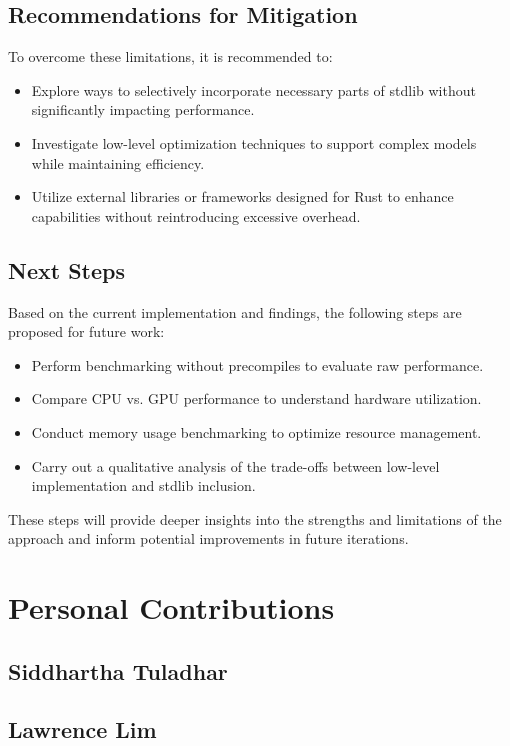 \documentclass{scrartcl}
\begin{document}
\subsection{Recommendations for Mitigation}
To overcome these limitations, it is recommended to:
\begin{itemize}
    \item Explore ways to selectively incorporate necessary parts of stdlib without significantly impacting performance.
    \item Investigate low-level optimization techniques to support complex models while maintaining efficiency.
    \item Utilize external libraries or frameworks designed for Rust to enhance capabilities without reintroducing excessive overhead.
\end{itemize}

\subsection{Next Steps}
Based on the current implementation and findings, the following steps are proposed for future work:
\begin{itemize}
    \item Perform benchmarking without precompiles to evaluate raw performance.
    \item Compare CPU vs. GPU performance to understand hardware utilization.
    \item Conduct memory usage benchmarking to optimize resource management.
    \item Carry out a qualitative analysis of the trade-offs between low-level implementation and stdlib inclusion.
\end{itemize}

These steps will provide deeper insights into the strengths and limitations of the approach and inform potential improvements in future iterations.


\section{Personal Contributions}

\subsection{Siddhartha Tuladhar}

\subsection{Lawrence Lim}
\end{document}
